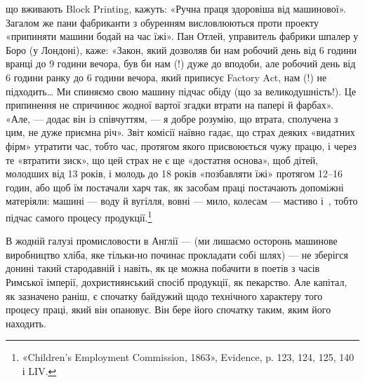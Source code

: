 що вживають Block Printing, кажуть: «Ручна праця
здоровіша від машинової». Загалом же пани фабриканти з обуренням
висловлюються проти проекту «припиняти машини бодай
на час їжі». Пан Отлей, управитель фабрики шпалер у Боро
(у Лондоні), каже: «Закон, який дозволяв би нам робочий день
від 6 години вранці до 9 години вечора, був би нам (!) дуже до вподоби,
але робочий день від 6 години ранку до 6 години вечора,
який приписує Factory Act, нам (!) не підходить\dots{} Ми спиняємо
свою машину підчас обіду (що за великодушність!). Це припинення
не спричинює жодної вартої згадки втрати на папері й фарбах».
«Але, — додає він із співчуттям, — я добре розумію, що втрата,
сполучена з цим, не дуже приємна річ». Звіт комісії наївно гадає,
що страх деяких «видатних фірм» утратити час, тобто час, протягом
якого присвоюється чужу працю, і через те «втратити зиск»,
що цей страх не є ще «достатня основа», щоб дітей, молодших
від 13 років, і молодь до 18 років «позбавляти їжі» протягом
12--16 годин, або щоб їм постачали харч так, як засобам праці
постачають допоміжні матеріяли: машині — воду й вугілля,
вовні — мило, колесам — мастиво і~, тобто підчас самого
процесу продукції.\footnote{
«Children’s Employment Commission, 1863», Evidence, p. 123,
124, 125, 140 і LIV.
}

В жодній галузі промисловости в Англії — (ми лишаємо осторонь
машинове виробництво хліба, яке тільки-но починає прокладати
собі шлях) — не зберігся донині такий стародавній
і навіть, як це можна побачити в поетів з часів Римської імперії,
дохристиянський спосіб продукції, як пекарство. Але капітал,
як зазначено раніш, є спочатку байдужий щодо технічного характеру
того процесу праці, який він опановує. Він бере його
спочатку таким, яким його находить.

